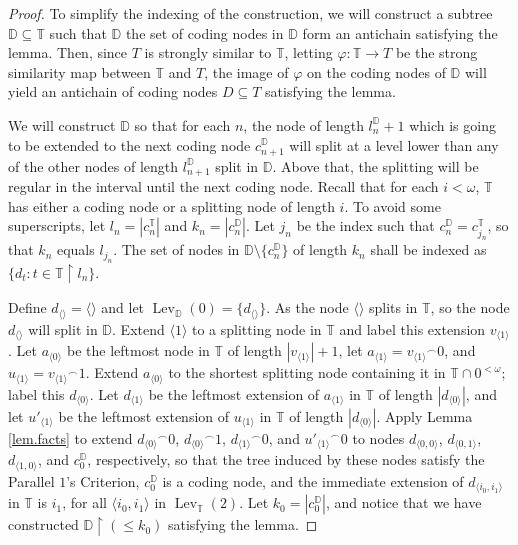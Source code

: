 \documentclass{amsart}
\theoremstyle{remark}
\theoremstyle{definition}
\theoremstyle{remark}
\newcommand{\om}{\omega}
\newcommand{\sse}{\subseteq}
\DeclareMathOperator{\Lev}{Lev}
\newcommand{\re}{\restriction}
\newcommand{\bD}{\mathbb{D}}
\newcommand{\bT}{\mathbb{T}}
\newcommand{\ra}{\rightarrow}
\newcommand{\lgl}{\langle}
\newcommand{\rgl}{\rangle}
\newcommand{\POC}{Parallel $1$'s Criterion}
\begin{document}
\begin{proof}
To simplify the indexing of the construction,
we will  construct a subtree
 $\bD\sse\bT$
such that $\bD$
the set of coding nodes in $\bD$  form
 an antichain
satisfying the lemma.
Then, since $T$ is strongly similar to $\bT$,
letting $\varphi:\bT\ra T$ be the strong similarity map  between $\bT$ and $T$,
the image of $\varphi$ on the coding nodes of  $\bD$ will yield an antichain of coding nodes $D\sse T$ satisfying the lemma.


We will construct $\bD$ so that  for each $n$,
the node of length $l^{\bD}_{n}+1$ which  is going to be extended to the next  coding node $c^{\bD}_{n+1}$ will  split at a  level lower than
 any of the other nodes of length $l^{\bD}_{n+1}$  split in $\bD$.
Above that, the splitting will be regular in the interval until  the next coding node.
Recall that  for each $i<\om$,
 $\bT$
 has either a coding node or a splitting node of length $i$.
To avoid some superscripts, let
 $l_n=|c^{\bT}_n|$
and $k_n=|c^{\bD}_n|$.
Let
$j_n$  be the index such that $c^{\bD}_n=c^{\bT}_{j_n}$, so that
 $k_n$  equals $l_{j_n}$.
The set of  nodes in  $\bD\setminus\{c^{\bD}_n\}$ of length  $k_n$
 shall be indexed  as $\{d_t:t\in \bT\re l_n\}$.


Define  $d_{\lgl\rgl}=\lgl\rgl$ and
let $\Lev_{\bD}(0)=\{d_{\lgl\rgl}\}$.
As the node $\lgl\rgl$ splits in $\bT$,
so the node $d_{\lgl\rgl}$ will split in $\bD$.
Extend $\lgl 1 \rgl$ to a splitting node in $\bT$ and label this extension $v_{\lgl 1\rgl}$.
Let $a_{\lgl 0\rgl }$ be the leftmost node in $\bT$ of length $|v_{\lgl 1\rgl}|+1$,
let $a_{\lgl 1\rgl}={v_{\lgl 1\rgl}}^{\frown}0$,
and $u_{\lgl 1\rgl}={v_{\lgl 1\rgl}}^{\frown}1$.
Extend $a_{\lgl 0\rgl }$ to the shortest  splitting node  containing it in $\bT\cap 0^{<\om}$; label this $d_{\lgl 0\rgl}$.
Let $d_{\lgl 1\rgl}$ be the leftmost extension of $a_{\lgl 1\rgl}$ in $\bT$ of length $|d_{\lgl 0\rgl}|$,
and let $u'_{\lgl 1\rgl}$ be the leftmost
extension of $u_{\lgl 1\rgl}$ in $\bT$ of length $|d_{\lgl 0\rgl}|$.
Apply Lemma \ref{lem.facts}
to extend  ${d_{\lgl 0\rgl}}^{\frown}0$, ${d_{\lgl 0\rgl}}^{\frown}1$, ${d_{\lgl 1\rgl}}^{\frown}0$, and
${u'_{\lgl 1\rgl}}^\frown 0$
to nodes
$d_{\lgl 0,0\rgl}$, $d_{\lgl 0,1\rgl}$, $d_{\lgl 1,0\rgl}$, and $c^{\bD}_0$, respectively,
so that
the tree induced by these nodes satisfy the \POC,
$c^{\bD}_0$ is a coding node,
and the immediate extension of $d_{\lgl i_0,i_1\rgl}$
in $\bT$ is $i_1$,
for all $\lgl i_0,i_1\rgl$ in $\Lev_{\bT}(2)$.
Let $k_0=|c^{\bD}_0|$, and notice that we have constructed $\bD\re(\le k_0)$ satisfying the lemma.




\end{proof}
\end{document}
